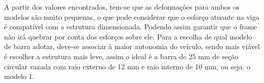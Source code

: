 A partir dos valores encontrados, tem-se que as deformações para ambos os modelos são muito pequenas, o que pode considerar que o esforço atuante na viga é compatível com a estrutura dimensionada. Podendo assim garantir que o frame não irá quebrar por conta dos esforços sobre ele. Para a escolha de qual modelo de barra adotar, deve-se associar à maior autonomia do veiculo, sendo mais viável é escolher a estrutura mais leve, assim o ideal é a barra de 25 mm de seção circular vazada com raio externo de 12 mm e raio interno de 10 mm, ou seja, o modelo 1. \cite{resistmat2010}
